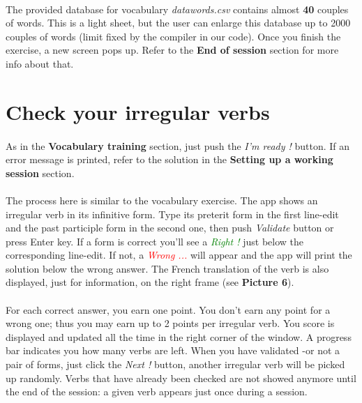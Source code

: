 \documentclass[12pt, a4paper]{report}
\begin{document}
\paragraph{}The provided database for vocabulary \textit{datawords.csv} contains almost \textbf{40} couples of words. This is a light sheet, but the user can enlarge this database up to 2000 couples of words (limit fixed by the compiler in our code). Once you finish the exercise, a new screen pops up. Refer to the \textbf{End of session} section for more info about that.
\newpage
\section*{\hspace{0.6cm}Check your irregular verbs}

\paragraph{}As in the \textbf{Vocabulary training} section, just push the \textit{I'm ready !} button. If an error message is printed, refer to the solution in the \textbf{Setting up a working session} section.

\paragraph{}The process here is similar to the vocabulary exercise. The app shows an irregular verb in its infinitive form. Type its preterit form in the first line-edit and the past participle form in the second one, then push \textit{Validate} button or press Enter key. If a form is correct you'll see a \textit{\textcolor{Green}{Right !}} just below the corresponding line-edit. If not, a \textit{\textcolor{Red}{Wrong ...}} will appear and the app will print the solution below the wrong answer. The French translation of the verb is also displayed, just for information, on the right frame (see \textbf{Picture 6}).

\paragraph{}For each correct answer, you earn one point. You don't earn any point for a wrong one; thus you may earn up to 2 points per irregular verb. You score is displayed and updated all the time in the right corner of the window. A progress bar indicates you how many verbs are left. When you have validated -or not a pair of forms, just click the \textit{Next !} button, another irregular verb will be picked up randomly. Verbs that have already been checked are not showed anymore until the end of the session: a given verb appears just once during a session.
\end{document}
